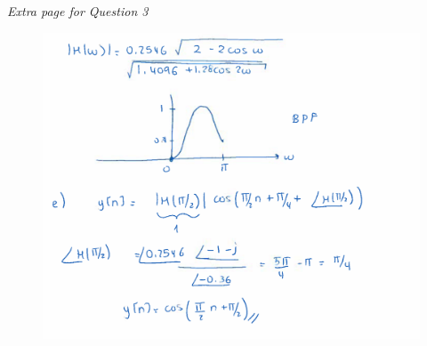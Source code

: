 \documentclass{article}
\begin{document}
\begin{enumerate}
    \newpage
    \textit{Extra page for Question 3}
    \begin{figure}[H]
        \centering
        \includegraphics[width=\textwidth]{mt2_q3_d_e.png}
    \end{figure}
\end{enumerate}
\end{document}

